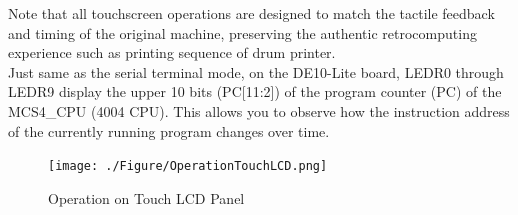Note that all touchscreen operations are designed to match the tactile feedback and timing of the original machine, preserving the authentic retrocomputing experience such as printing sequence of drum printer.\\

Just same as the serial terminal mode, on the DE10-Lite board, LEDR0 through LEDR9 display the upper 10 bits (PC[11:2]) of the program counter (PC) of the MCS4\_CPU (4004 CPU). This allows you to observe how the instruction address of the currently running program changes over time.

\begin{figure}[htbp]
    \texttt{[image: ./Figure/OperationTouchLCD.png]}
    \caption{Operation on Touch LCD Panel}
    \label{fig:OPERATIONTOUCHLCD}
\end{figure}






